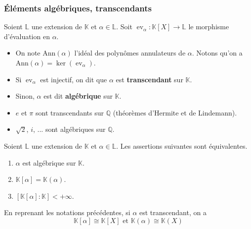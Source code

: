  \subsubsection{Éléments algébriques, transcendants}


  \begin{definition}
    Soient $\mathbb{L}$ une extension de $\mathbb{K}$ et $\alpha \in \mathbb{L}$. Soit $\operatorname{ev}_\alpha : \mathbb{K}[X] \rightarrow \mathbb{L}$ le morphisme d'évaluation en $\alpha$.
    \begin{itemize}
      \item On note $\mathrm{Ann}(\alpha)$ l'idéal des polynômes annulateurs de $\alpha$. Notons qu'on a $\mathrm{Ann}(\alpha) = \ker(\operatorname{ev}_\alpha)$.
      \item Si $\operatorname{ev}_\alpha$ est injectif, on dit que $\alpha$ est \textbf{transcendant} sur $\mathbb{K}$.
      \item Sinon, $\alpha$ est dit \textbf{algébrique} sur $\mathbb{K}$.
    \end{itemize}
  \end{definition}

  \begin{example}
    \begin{itemize}
      \item $e$ et $\pi$ sont transcendants sur $\mathbb{Q}$ (théorèmes d'Hermite et de Lindemann).
      \item $\sqrt{2}$, $i$, ... sont algébriques sur $\mathbb{Q}$.
    \end{itemize}
  \end{example}

  \begin{proposition}
    Soient $\mathbb{L}$ une extension de $\mathbb{K}$ et $\alpha \in \mathbb{L}$. Les assertions suivantes sont équivalentes.
    \begin{enumerate}[label={\bfseries(\roman*)}]
      \item $\alpha$ est algébrique sur $\mathbb{K}$.
      \item $\mathbb{K}[\alpha] = \mathbb{K}(\alpha)$.
      \item $[\mathbb{K}[\alpha]:\mathbb{K}] < +\infty$.
    \end{enumerate}
  \end{proposition}

  \begin{proposition}
    En reprenant les notations précédentes, si $\alpha$ est transcendant, on a
    \[ \mathbb{K}[\alpha] \cong \mathbb{K}[X] \text{ et } \mathbb{K}(\alpha) \cong \mathbb{K}(X) \]
  \end{proposition}

